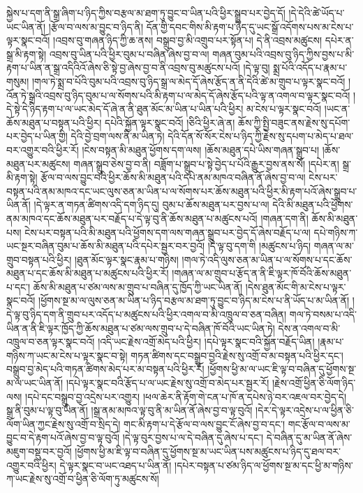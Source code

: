 སྐྱེས་པ་དག་ནི་སྒྲ་ཞིག་པ་ཉིད་ཀྱིས་བརྩལ་མ་ཐག་ཏུ་བྱུང་བ་ཡིན་པའི་ཕྱིར་སྒྲུབ་པར་བྱེད་དོ། །དེ་དེའི་ཚེ་ཡོད་པ་ཡང་ཡིན་ནོ། །རྩོལ་བ་ལས་མ་བྱུང་བ་ཉིད་ནི། དོན་གྱི་དབང་གིས་མི་རྟག་པ་ཉིད་དུ་ཡང་སྒྲོ་འདོགས་པས་མ་ངེས་པ་ལྟར་སྣང་བའོ། །འབྲས་བུ་གཞན་ཉིད་ཀྱི་ཆ་ནས། བསྒྲུབ་བྱ་མི་འགྲུབ་པར་སྟོན་པ། དེ་ནི་འབྲས་མཚུངས། དཔེར་ན་སྒྲ་མི་རྟག་སྟེ། འབྲས་བུ་ཡིན་པའི་ཕྱིར་བུམ་པ་བཞིན་ཞེས་བྱ་བ་ལ། གཞན་བུམ་པའི་འབྲས་བུ་ཉིད་ཀྱིས་བྱས་པ་མི་རྟག་པ་ཡིན་ན་སྒྲ་འདིའིའོ་ཞེས་ཅི་སྟེ་བྱ་ཞེས་བྱ་བ་ནི་འབྲས་བུ་མཚུངས་པའོ། །དེ་ལྟ་བུ། སྨྲ་པོའི་འདོད་པ་རྣམ་པ་གསུམ། །གལ་ཏེ་སྨྲ་བ་པོའི་བུམ་པའི་འབྲས་བུ་ཉིད་སྒྲ་ལ་མེད་དོ་ཞེས་རྩོད་ན་ནི་དེའི་ཚེ་མ་གྲུབ་པ་ལྟར་སྣང་བའོ། །འོན་ཏེ་སྒྲའི་འབྲས་བུ་ཉིད་བུམ་པ་ལ་སོགས་པའི་མི་རྟག་པ་ལ་མེད་དོ་ཞེས་རྩོད་པའི་ལྟ་ན་འགལ་བ་ལྟར་སྣང་བའོ། །དེ་སྟེ་དེ་ཉིད་རྟག་པ་ལ་ཡང་མེད་དོ་ཞེ་ན་ནི་ཐུན་མོང་མ་ཡིན་པ་ཡིན་པའི་ཕྱིར། མ་ངེས་པ་ལྟར་སྣང་བའོ། །ཡང་ན་ཆོས་མཐུན་པ་བསྟན་པའི་ཕྱིར། དཔེའི་སྐྱོན་ལྟར་སྣང་བའོ། །ཅིའི་ཕྱིར་ཞེ་ན། ཆོས་ཀྱི་སྤྱི་བཟུང་ནས་རྗེས་སུ་དཔོག་པར་བྱེད་པ་ཡིན་གྱི། དེའི་བྱེ་བྲག་ལས་ནི་མ་ཡིན་ཏེ། དེའི་དོན་སོ་སོར་ངེས་པ་ཉིད་ཀྱི་རྗེས་སུ་དཔག་པ་མེད་པ་ཐལ་བར་འགྱུར་བའི་ཕྱིར་རོ། །ངེས་བསྟན་མི་མཐུན་ཕྱོགས་དག་ལས། །ཆོས་མཐུན་དཔེ་ཡིས་གཞན་སྒྲུབ་པ། །ཆོས་མཐུན་པར་མཚུངས། གཞན་སྒྲུབ་ཅེས་བྱ་བ་ནི། བཟློག་པ་སྒྲུབ་པ་སྟེ་བྱེད་པ་པོའི་རྒྱུར་བྱས་ནས་སོ། །དཔེར་ན། སྒྲ་མི་རྟག་སྟེ། རྩོལ་བ་ལས་བྱུང་བའི་ཕྱིར་ཆོས་མི་མཐུན་པའི་དཔེ་ནམ་མཁའ་བཞིན་ནོ་ཞེས་བྱ་བ་ལ། ངེས་པར་བསྟན་པའི་ནམ་མཁའ་དང་ཡང་ལུས་ཅན་མ་ཡིན་པ་ལ་སོགས་པར་ཆོས་མཐུན་པའི་ཕྱིར་མི་རྟག་པའོ་ཞེས་སྒྲུབ་པ་ཡིན་ནོ། །དེ་ལྟར་ན་གཏན་ཚིགས་འདི་དག་ཉིད་དུ། བུམ་པ་ཆོས་མཐུན་པར་བྱས་པ་ལ། དེའི་མི་མཐུན་པའི་ཕྱོགས་ནམ་མཁའ་དང་ཆོས་མཐུན་པར་བརྗོད་པ་དེ་ལྟ་བུ་ནི་ཆོས་མཐུན་པ་མཚུངས་པའོ། །གཞན་དག་ནི། ཆོས་མི་མཐུན་པས། ངེས་པར་བསྟན་པའི་མི་མཐུན་པའི་ཕྱོགས་དག་ལས་གཞན་སྒྲུབ་པར་བྱེད་དོ་ཞེས་བརྗོད་པ་ལ། དཔེ་གཉིས་ཀ་ཡང་སྔར་བཞིན་བུམ་པ་ཆོས་མི་མཐུན་པའི་དཔེར་སྦྱར་བར་བྱའོ། །དེ་ལྟ་བུ་དག་གི །མཚུངས་པ་ཉིད། གཞན་ལ་མ་གྲུབ་བསྟན་པའི་ཕྱིར། །ཐུན་མོང་ལྟར་སྣང་རྣམ་པ་གཉིས། །གལ་ཏེ་འདི་ལུས་ཅན་མ་ཡིན་པ་ལ་སོགས་པ་དང་ཆོས་མཐུན་པ་དང་ཆོས་མི་མཐུན་པ་མཚུངས་པའི་ཕྱིར་རོ། །གཞན་ལ་མ་གྲུབ་པ་རྩོད་ན་ནི་ཇི་ལྟར་ཁོ་བོའི་ཆོས་མཐུན་པ་དང་། ཆོས་མི་མཐུན་པ་ཙམ་ལས་མ་གྲུབ་པ་བཞིན་དུ་ཁྱོད་ཀྱི་ཡང་ཡིན་ནོ། །དེས་ཐུན་མོང་གི་མ་ངེས་པ་ལྟར་སྣང་བའོ། །ཕྱོགས་སྔ་མ་ལ་ལུས་ཅན་མ་ཡིན་པ་ཉིད་བརྩལ་མ་ཐག་ཏུ་བྱུང་བ་ཉིད་མ་ངེས་པ་ནི་ཡོད་པ་མ་ཡིན་ནོ། །དེ་ལྟ་བུ་ཉིད་དག་ནི་གྲུབ་པར་འདོད་པ་མཚུངས་པའི་ཕྱིར་འགལ་བ་མི་འཁྲུལ་བ་ཅན་བཞིན། གལ་ཏེ་བསམ་པ་འདི་ཡིན་ན་ནི་ཇི་ལྟར་ཁྱོད་ཀྱི་ཆོས་མཐུན་པ་ཙམ་ལས་གྲུབ་པ་དེ་བཞིན་ཁོ་བོའི་ཡང་ཡིན་ཏེ། དེས་ན་འགལ་བ་མི་འཁྲུལ་བ་ཅན་ལྟར་སྣང་བའོ། །འདི་ཡང་རྗེས་འགྲོ་མེད་པའི་ཕྱིར། །དཔེ་ལྟར་སྣང་བའི་སྐྱོན་བརྗོད་ཡིན། །རྣམ་པ་གཉིས་ཀ་ཡང་མ་ངེས་པ་ལྟར་སྣང་བ་སྟེ། གཏན་ཚིགས་དང་བསྒྲུབ་བྱའི་རྗེས་སུ་འགྲོ་བ་མ་བསྟན་པའི་ཕྱིར་དང་། བསྒྲུབ་བྱ་མེད་པའི་གཏན་ཚིགས་མེད་པར་མ་བསྟན་པའི་ཕྱིར་རོ། །ཕྱོགས་ཕྱི་མ་ལ་ཡང་ཇི་ལྟ་བ་བཞིན་དུ་ཕྱོགས་སྔ་མ་ལ་ཡང་ཡིན་ནོ། །དཔེ་ལྟར་སྣང་བའི་རྩོད་པ་ལ་ཡང་རྗེས་སུ་འགྲོ་བ་མེད་པར་སྦྱར་རོ། །རྗེས་འགྲོ་ཕྱིན་ཅི་ལོག་ཉིད་ལས། །དཔེ་དང་བསྒྲུབ་བྱ་འདྲེས་པར་འགྱུར། །ཕལ་ཆེར་ནི་རྟོག་གེ་ངན་པ་ཁོ་ན་དཔེས་ཉེ་བར་འཇལ་བར་བྱེད་དེ། སྒྲ་ནི་བུམ་པ་ལྟ་བུ་ཡིན་ནོ། །སྒྲ་ནམ་མཁའ་ལྟ་བུ་ནི་མ་ཡིན་ནོ་ཞེས་བྱ་བ་ལྟ་བུའོ། །དེར་དེ་ལྟར་འདྲེས་པ་ལ་ཕྱིན་ཅི་ལོག་ཡིན་ཀྱང་རྗེས་སུ་འགྲོ་བ་སྲིད་དེ། གང་མི་རྟག་པ་དེ་རྩོལ་བ་ལས་བྱུང་ངོ་ཞེས་བྱ་བ་དང་། གང་རྩོལ་བ་ལས་མ་བྱུང་བ་དེ་རྟག་པའོ་ཞེས་བྱ་བ་ལྟ་བུའོ། །དེ་ལྟ་བུར་བྱས་པ་ལ་དེ་བཞིན་དུ་ཞེས་པ་དང་། དེ་བཞིན་དུ་མ་ཡིན་ནོ་ཞེས་མཇུག་བསྡུ་བར་བྱའོ། །ཕྱོགས་ཕྱི་མ་ཇི་ལྟ་བ་བཞིན་དུ་ཕྱོགས་སྔ་མ་ཡང་ཡིན་པས་མཚུངས་པ་ཉིད་དུ་ཐལ་བར་འགྱུར་བའི་ཕྱིར། དེ་ལྟར་སྣང་བ་ཡང་འཐད་པ་ཡིན་ནོ། །དཔེར་བསྟན་པ་ཙམ་ཉིད་ལ་ཕྱོགས་སྔ་མ་དང་ཕྱི་མ་གཉིས་ཀ་ཡང་རྗེས་སུ་འགྲོ་བ་ཕྱིན་ཅི་ལོག་ཏུ་མཚུངས་སོ། 